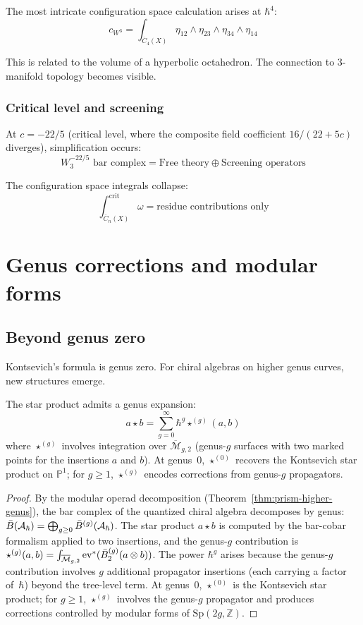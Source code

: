 The most intricate configuration space calculation arises at $\hbar^4$:
\[c_{W^3} = \int_{\overline{C}_4(X)} \eta_{12} \wedge \eta_{23} \wedge \eta_{34} \wedge \eta_{14}\]

This is related to the volume of a hyperbolic octahedron. The connection to 3-manifold topology becomes visible.

\subsubsection{Critical level and screening}

At $c = -22/5$ (critical level, where the composite field coefficient $16/(22+5c)$ diverges), simplification occurs:
\[W_3^{-22/5} \text{ bar complex} = \text{Free theory} \oplus \text{Screening operators}\]

The configuration space integrals collapse:
\[\int_{\overline{C}_n(X)}^{\text{crit}} \omega = \text{residue contributions only}\]

\section{Genus corrections and modular forms}

\subsection{Beyond genus zero}

Kontsevich's formula is genus zero. For chiral algebras on higher genus curves, new structures emerge.

\begin{theorem}\label{thm:deformation-genus-expansion}
The star product admits a genus expansion:
\[a \star b = \sum_{g=0}^\infty \hbar^g \star^{(g)}(a,b)\]
where $\star^{(g)}$ involves integration over $\overline{\mathcal{M}}_{g,2}$ (genus-$g$ surfaces with two marked points for the insertions $a$ and $b$).  At genus~0, $\star^{(0)}$ recovers the Kontsevich star product on $\mathbb{P}^1$; for $g \geq 1$, $\star^{(g)}$ encodes corrections from genus-$g$ propagators.
\end{theorem}

\begin{proof}
By the modular operad decomposition (Theorem~\ref{thm:prism-higher-genus}), the bar complex of the quantized chiral algebra decomposes by genus: $\bar{B}(\mathcal{A}_\hbar) = \bigoplus_{g \geq 0} \bar{B}^{(g)}(\mathcal{A}_\hbar)$.  The star product $a \star b$ is computed by the bar-cobar formalism applied to two insertions, and the genus-$g$ contribution is $\star^{(g)}(a,b) = \int_{\overline{\mathcal{M}}_{g,2}} \mathrm{ev}^*(\bar{B}^{(g)}_2(a \otimes b))$.  The power $\hbar^g$ arises because the genus-$g$ contribution involves $g$ additional propagator insertions (each carrying a factor of~$\hbar$) beyond the tree-level term.  At genus~0, $\star^{(0)}$ is the Kontsevich star product; for $g \geq 1$, $\star^{(g)}$ involves the genus-$g$ propagator and produces corrections controlled by modular forms of $\mathrm{Sp}(2g, \mathbb{Z})$.
\end{proof}

